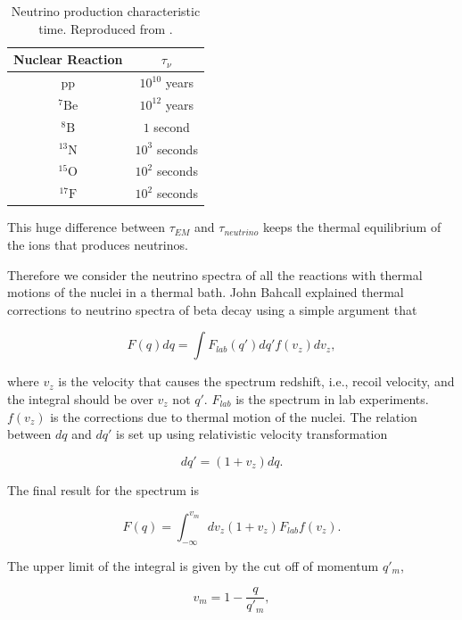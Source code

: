 \begin{table}[ht]
\centering
\begin{tabular}{|c|c|}
\hline
 Nuclear Reaction &  $\tau_{\nu}$ \\
 \hline
pp  & $10^{10}$ years \\
$\mathrm{ {}^7Be }$ & $10^{12}$ years \\
$\mathrm{ {}^8B }$ & $1$ second \\
$\mathrm{ {}^{13}N }$ & $10^3$ seconds \\
$\mathrm{ {}^{15}O }$ & $10^2$ seconds \\
$\mathrm{ {}^{17}F }$ & $10^2$ seconds\\
\hline
\end{tabular}
\caption{Neutrino production characteristic time. Reproduced from \cite{Bahcall1991}.}
\label{tab:neutrino_production_characteristic_time}
\end{table}

This huge difference between $\tau_{EM}$ and $\tau_{neutrino}$ keeps the thermal equilibrium of the ions that produces neutrinos.

Therefore we consider the neutrino spectra of all the reactions with thermal motions of the nuclei in a thermal bath. John Bahcall explained thermal corrections to neutrino spectra of beta decay using a simple argument that\cite{Bahcall1991}

\begin{equation}
F(q) dq = \int F_{lab}(q') dq' f(v_z) dv_z,
\end{equation}

where $v_z$ is the velocity that causes the spectrum redshift, i.e., recoil velocity, and the integral should be over $v_z$ not $q'$. $F_{lab}$ is the spectrum in lab experiments. $f(v_z)$ is the corrections due to thermal motion of the nuclei. The relation between $dq$ and $dq'$ is set up using relativistic velocity transformation

\begin{equation}
dq' = ( 1+ v_z ) dq.
\end{equation}

The final result for the spectrum is

\begin{equation}
F(q) = \int_{-\infty}^{v_m} d v_z (1+v_z) F_{lab}f(v_z).
\end{equation}

The upper limit of the integral is given by the cut off of momentum $q'_m$,

\begin{equation}
v_m = 1 - \frac{q}{q'_m},
\end{equation}

